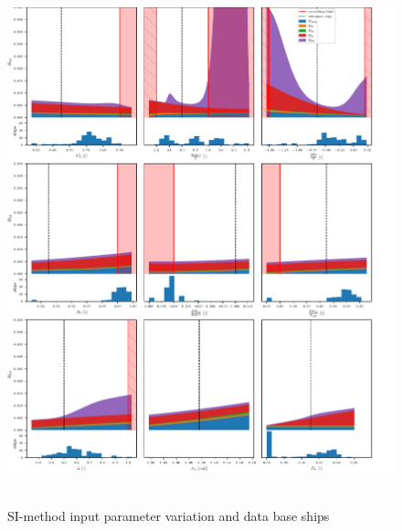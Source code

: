 \begin{figure}[H]
    \centering
    \includegraphics[width=6in, height = 6in ]{figures/SI-sensitivity.pdf}
        \vspace{-0.5cm}
    \caption{SI-method input parameter variation and data base ships}
    \label{fig:SI_sensitivity}
\end{figure}



